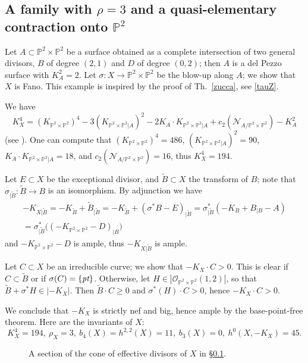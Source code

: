 \documentclass[a4paper,12pt]{amsart}
\theoremstyle{definition}
\numberwithin{figure}{section}
\numberwithin{table}{section}
\newcommand{\w}{\widetilde}
\newcommand{\ma}{\mathcal}
\newcommand{\ol}{\mathcal{O}}
\newcommand{\pr}{\mathbb{P}}
\newcommand{\pt}{\text{\it pt}}
\begin{document}
 \subsection{A family with $\rho=3$ and a quasi-elementary  contraction onto $\pr^2$}\label{exX}
\noindent Let $A\subset\pr^2\times\pr^2$ be a surface obtained as a complete intersection of two general divisors, $B$ of degree $(2,1)$ and $D$ of degree $(0,2)$; then $A$ is a del Pezzo surface with $K_A^2=2$.
Let $\sigma\colon X\to\pr^2\times\pr^2$ be the blow-up along $A$; we show that $X$ is Fano. This example is inspired by the proof of Th.~\ref{zucca}, see \ref{tauZ}.

 We have
  $$K_X^4=(K_{\pr^2\times\pr^2})^4-3(K_{{\pr^2\times\pr^2}|A})^2-2K_{A}\cdot K_{{\pr^2\times\pr^2}|A}+c_2(\ma{N}_{A/\pr^2\times\pr^2})-K_A^2$$
(see \cite[Lemma 2.4]{3folds}). One can compute that $(K_{\pr^2\times\pr^2})^4=486$, $(K_{{\pr^2\times\pr^2}|A})^2=90$,  $K_{A}\cdot K_{{\pr^2\times\pr^2}|A}=18$,  and $c_2(\ma{N}_{A/\pr^2\times\pr^2})=16$,
 thus $K_X^4=194$.

Let $E\subset X$ be the exceptional divisor, and $\w{B}\subset X$ the transform of $B$; note that $\sigma_{|\w{B}}\colon\w{B}\to B$ is an isomorphism. By adjunction we have
\begin{gather*}
-K_{X|\w{B}}=-K_{\w{B}}+\w{B}_{|\w{B}}=-K_{\w{B}}+(\sigma^*B-E)_{|\w{B}}
=\sigma_{|\w{B}}^*(-K_B+B_{|B}-A)\\
=\sigma_{|\w{B}}^*\bigl((-K_{\pr^2\times\pr^2}-D)_{|B}\bigr)
\end{gather*}
and $-K_{\pr^2\times\pr^2}-D$ is ample, thus $-K_{X|\w{B}}$ is ample.

Let $C\subset X$ be an irreducible curve; we show that $-K_X\cdot C>0$. This is clear if $C\subset\w{B}$ or if $\sigma(C)=\{\pt\}$. Otherwise, let
$H\in |\ol_{\pr^2\times\pr^2}(1,2)|$, so that $\w{B}+\sigma^*H\in|-K_X|$. Then
$\w{B}\cdot C\geq 0$ and $\sigma^*(H)\cdot C>0$, hence $-K_X\cdot C>0$.

We conclude that $-K_X$ is strictly nef and big, hence ample by the base-point-free theorem. Here are the invariants of $X$:
$$K_X^4=194,\ \rho_X=3,\ b_4(X)=h^{2,2}(X)=11,\ b_3(X)=0,\ h^0(X,-K_X)=45.$$

\begin{figure}[b]\caption{A section of the cone of effective divisors of $X$ in \S\ref{exX}.}\label{figuraexX}

\bigskip
  
  
\end{figure}
\end{document}
